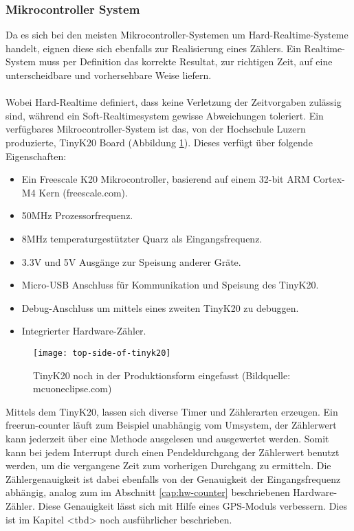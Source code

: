 	\subsubsection{Mikrocontroller System}
   		Da es sich bei den meisten Mikrocontroller-Systemen um Hard-Realtime-Systeme handelt, eignen diese sich ebenfalls zur Realisierung eines Zählers. Ein Realtime-System muss per Definition das korrekte Resultat, zur richtigen Zeit, auf eine unterscheidbare und vorhersehbare Weise liefern.\\
           \\
		Wobei Hard-Realtime definiert, dass keine Verletzung der Zeitvorgaben zulässig sind, während ein Soft-Realtimesystem gewisse Abweichungen toleriert. Ein verfügbares Mikrocontroller-System ist das, von der Hochschule Luzern produzierte, TinyK20 Board (Abbildung \ref{fig:TinyK20}). Dieses verfügt über folgende Eigenschaften:
		\begin{itemize}
			\item Ein Freescale K20 Mikrocontroller, basierend auf einem  32-bit ARM Cortex-M4 Kern (freescale.com).
			\item 50MHz Prozessorfrequenz.
			\item 8MHz temperaturgestützter Quarz als Eingangsfrequenz.
			\item 3.3V und 5V Ausgänge zur Speisung anderer Gräte.
			\item Micro-USB Anschluss für Kommunikation und Speisung des TinyK20.
			\item Debug-Anschluss um mittels eines zweiten TinyK20 zu debuggen.
			\item Integrierter Hardware-Zähler.
		\end{itemize}
		\begin{figure}[H]
        	\centering
        	\texttt{[image: top-side-of-tinyk20]}
        	\caption{TinyK20 noch in der Produktionsform eingefasst (Bildquelle: mcuoneclipse.com)}
        	\label{fig:TinyK20}
    	\end{figure}
    	Mittels dem TinyK20, lassen sich diverse Timer und Zählerarten erzeugen. Ein \glqq{}freerun-counter\grqq{} läuft zum Beispiel unabhängig vom Umsystem, der Zählerwert kann jederzeit über eine Methode ausgelesen und ausgewertet werden. Somit kann bei jedem Interrupt durch einen Pendeldurchgang der Zählerwert benutzt werden, um die vergangene Zeit zum vorherigen Durchgang zu ermitteln. Die Zählergenauigkeit ist dabei ebenfalls von der Genauigkeit der Eingangsfrequenz abhängig, analog zum im Abschnitt \ref{cap:hw-counter} beschriebenen Hardware-Zähler. Diese Genauigkeit lässt sich mit Hilfe eines GPS-Moduls verbessern. Dies ist im Kapitel <tbd> noch ausführlicher beschrieben.\\
